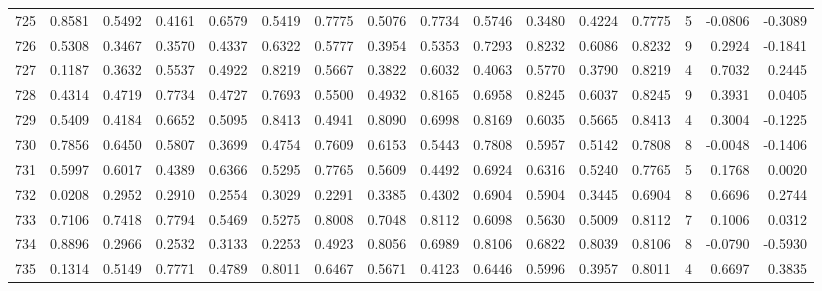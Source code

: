\begin{tabular}{lrrrrrrrrrrrrrrr}
725 &      0.8581 &  0.5492 &  0.4161 &  0.6579 &  0.5419 &  0.7775 &  0.5076 &  0.7734 &  0.5746 &  0.3480 &   0.4224 &     0.7775 &      5 &                   -0.0806 &                    -0.3089 \\
726 &      0.5308 &  0.3467 &  0.3570 &  0.4337 &  0.6322 &  0.5777 &  0.3954 &  0.5353 &  0.7293 &  0.8232 &   0.6086 &     0.8232 &      9 &                    0.2924 &                    -0.1841 \\
727 &      0.1187 &  0.3632 &  0.5537 &  0.4922 &  0.8219 &  0.5667 &  0.3822 &  0.6032 &  0.4063 &  0.5770 &   0.3790 &     0.8219 &      4 &                    0.7032 &                     0.2445 \\
728 &      0.4314 &  0.4719 &  0.7734 &  0.4727 &  0.7693 &  0.5500 &  0.4932 &  0.8165 &  0.6958 &  0.8245 &   0.6037 &     0.8245 &      9 &                    0.3931 &                     0.0405 \\
729 &      0.5409 &  0.4184 &  0.6652 &  0.5095 &  0.8413 &  0.4941 &  0.8090 &  0.6998 &  0.8169 &  0.6035 &   0.5665 &     0.8413 &      4 &                    0.3004 &                    -0.1225 \\
730 &      0.7856 &  0.6450 &  0.5807 &  0.3699 &  0.4754 &  0.7609 &  0.6153 &  0.5443 &  0.7808 &  0.5957 &   0.5142 &     0.7808 &      8 &                   -0.0048 &                    -0.1406 \\
731 &      0.5997 &  0.6017 &  0.4389 &  0.6366 &  0.5295 &  0.7765 &  0.5609 &  0.4492 &  0.6924 &  0.6316 &   0.5240 &     0.7765 &      5 &                    0.1768 &                     0.0020 \\
732 &      0.0208 &  0.2952 &  0.2910 &  0.2554 &  0.3029 &  0.2291 &  0.3385 &  0.4302 &  0.6904 &  0.5904 &   0.3445 &     0.6904 &      8 &                    0.6696 &                     0.2744 \\
733 &      0.7106 &  0.7418 &  0.7794 &  0.5469 &  0.5275 &  0.8008 &  0.7048 &  0.8112 &  0.6098 &  0.5630 &   0.5009 &     0.8112 &      7 &                    0.1006 &                     0.0312 \\
734 &      0.8896 &  0.2966 &  0.2532 &  0.3133 &  0.2253 &  0.4923 &  0.8056 &  0.6989 &  0.8106 &  0.6822 &   0.8039 &     0.8106 &      8 &                   -0.0790 &                    -0.5930 \\
735 &      0.1314 &  0.5149 &  0.7771 &  0.4789 &  0.8011 &  0.6467 &  0.5671 &  0.4123 &  0.6446 &  0.5996 &   0.3957 &     0.8011 &      4 &                    0.6697 &                     0.3835 \\

\end{tabular}
